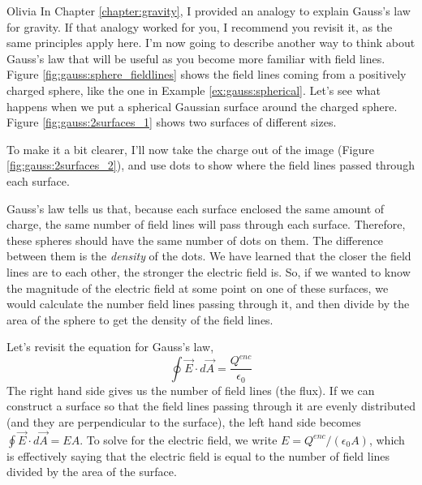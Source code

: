 %
\begin{studentOpinion}{Olivia}
In Chapter \ref{chapter:gravity}, I provided an analogy to explain Gauss's law for gravity. If that analogy worked for you, I recommend you revisit it, as the same principles apply here. I'm now going to describe another way to think about Gauss's law that will be useful as you become more familiar with field lines.
Figure \ref{fig:gauss:sphere_fieldlines} shows the field lines coming from a positively charged sphere, like the one in Example \ref{ex:gauss:spherical}. 
Let's see what happens when we put a spherical Gaussian surface around the charged sphere. Figure \ref{fig:gauss:2surfaces_1} shows two surfaces of different sizes.

To make it a bit clearer, I'll now take the charge out of the image (Figure \ref{fig:gauss:2surfaces_2}), and use dots to show where the field lines passed through each surface. 

Gauss's law tells us that, because each surface enclosed the same amount of charge, the same number of field lines will pass through each surface. Therefore, these spheres should have the same number of dots on them. The difference between them is the \textit{density} of the dots. We have learned that the closer the field lines are to each other, the stronger the electric field is. So, if we wanted to know the magnitude of the electric field at some point on one of these surfaces, we would calculate the number field lines passing through it, and then divide by the area of the sphere to get the density of the field lines. 

Let's revisit the equation for Gauss's law,
 \begin{equation}
 \oint \vec E\cdot d\vec A=\frac{Q^{enc}}{\epsilon_0}
 \end{equation}
The right hand side gives us the number of field lines (the flux). If we can construct a surface so that the field lines passing through it are evenly distributed (and they are perpendicular to the surface), the left hand side becomes $\oint \vec E\cdot d\vec A= EA$. To solve for the electric field, we write $E=Q^{enc}/(\epsilon_0A)$, which is effectively saying that the electric field is equal to the number of field lines divided by the area of the surface. 
\end{studentOpinion}

